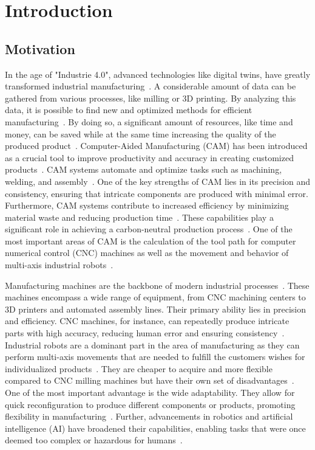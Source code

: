 \chapter{Introduction}%
\section{Motivation}%

In the age of "Industrie 4.0", advanced technologies like digital twins, have greatly transformed industrial manufacturing~\cite{Singh.2021}. A considerable amount of data can be gathered from various processes, like milling or 3D printing. By analyzing this data, it is possible to find new and optimized methods for efficient manufacturing~\cite{Ghobakhloo.2020}. By doing so, a significant amount of resources, like time and money, can be saved while at the same time increasing the quality of the produced product~\cite{Bibby.2018,Simonis.2016}.\newline
Computer-Aided Manufacturing (CAM) has been introduced as a crucial tool to improve productivity and accuracy in creating customized products~\cite{Feldhausen.2022}. CAM systems automate and optimize tasks such as machining, welding, and assembly~\cite{LalitNarayan.2013b}. One of the key strengths of CAM lies in its precision and consistency, ensuring that intricate components are produced with minimal error. Furthermore, CAM systems contribute to increased efficiency by minimizing material waste and reducing production time~\cite{Dubovska.2014}. These capabilities play a significant role in achieving a carbon-neutral production process~\cite{Saxena.2020}. One of the most important areas of CAM is the calculation of the tool path for computer numerical control (CNC) machines as well as the movement and behavior of multi-axis industrial robots~\cite{Pan}. \newline


Manufacturing machines are the backbone of modern industrial processes~\cite{Bi.2020}. These machines encompass a wide range of equipment, from CNC machining centers to 3D printers and automated assembly lines. Their primary ability lies in precision and efficiency. CNC machines, for instance, can repeatedly produce intricate parts with high accuracy, reducing human error and ensuring consistency~\cite{Jia.2018}. \newline
Industrial robots are a dominant part in the area of manufacturing as they can perform multi-axis movements that are needed to fulfill the customers wishes for individualized products~\cite{Sherwani.2020}. They are cheaper to acquire and more flexible compared to CNC milling machines but have their own set of disadvantages~\cite{Iglesias.2015}. One of the most important advantage is the wide adaptability. They allow for quick reconfiguration to produce different components or products, promoting flexibility in manufacturing~\cite{Billard.2019}. Further, advancements in robotics and artificial intelligence (AI) have broadened their capabilities, enabling tasks that were once deemed too complex or hazardous for humans~\cite{Goel.2020}. \newline

